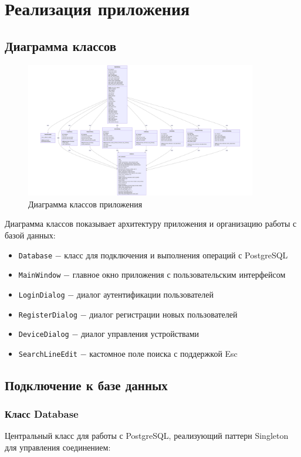 \documentclass[oneside,a4paper,14pt]{extarticle}
\begin{document}
\clearpage
\section*{Реализация приложения}

\subsection*{Диаграмма классов}
\begin{figure}[H]
  \centering
  \includegraphics[width=0.9\textwidth]{pics/class_diagram.png}
  \caption{Диаграмма классов приложения}
\end{figure}

Диаграмма классов показывает архитектуру приложения и организацию работы с базой данных:
\begin{itemize}
  \item \texttt{Database} $-$ класс для подключения и выполнения операций с PostgreSQL
  \item \texttt{MainWindow} $-$ главное окно приложения с пользовательским интерфейсом
  \item \texttt{LoginDialog} $-$ диалог аутентификации пользователей
  \item \texttt{RegisterDialog} $-$ диалог регистрации новых пользователей
  \item \texttt{DeviceDialog} $-$ диалог управления устройствами
  \item \texttt{SearchLineEdit} $-$ кастомное поле поиска с поддержкой Esc
\end{itemize}

\subsection*{Подключение к базе данных}

\subsubsection*{Класс Database}
Центральный класс для работы с PostgreSQL, реализующий паттерн Singleton для управления соединением:
\end{document}
